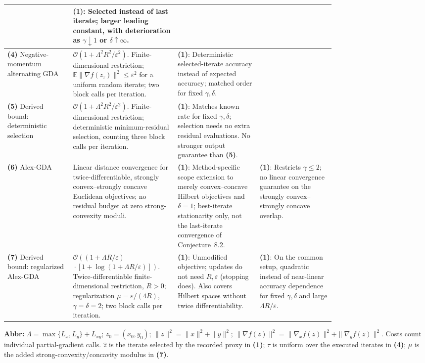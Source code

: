 \begin{table}[tp]
\begin{threeparttable}
\begin{tabularx}{\linewidth}{@{}>{\raggedright\arraybackslash}p{0.20\linewidth}>{\raggedright\arraybackslash}p{0.32\linewidth}>{\raggedright\arraybackslash}p{0.25\linewidth}>{\raggedright\arraybackslash}X@{}}
& \textbf{(1)}: Selected instead of last iterate; larger leading constant, with deterioration as $\gamma\downarrow1$ or $\delta\uparrow\infty$. \\
\midrule
\textbf{(4)} Negative-momentum alternating GDA \citep[Thm.~3.1]{bscShugart2026}
& $\mathcal{O}(1+\Lambda^2R^2/\varepsilon^2)$.
Finite-dimensional restriction; $\mathbb{E}\|\nabla f(z_\tau)\|^2\le\varepsilon^2$ for a uniform random iterate; two block calls per iteration.
& \textbf{(1)}: Deterministic selected-iterate accuracy instead of expected accuracy; matched order for fixed $\gamma,\delta$.
& \\
\midrule
\textbf{(5)} Derived bound: deterministic selection \citep[Thm.~3.1]{bscShugart2026}
& $\mathcal{O}(1+\Lambda^2R^2/\varepsilon^2)$.
Finite-dimensional restriction; deterministic minimum-residual selection, counting three block calls per iteration.
& \textbf{(1)}: Matches known rate for fixed $\gamma,\delta$; selection needs no extra residual evaluations. No stronger output guarantee than \textbf{(5)}.
& \\
\midrule
\textbf{(6)} Alex-GDA \citep[Thm.~5.1]{bscLee2024}
& Linear distance convergence for twice-differentiable, strongly convex--strongly concave Euclidean objectives; no residual budget at zero strong-convexity moduli.
& \textbf{(1)}: Method-specific scope extension to merely convex--concave Hilbert objectives and $\delta=1$; best-iterate stationarity only, not the last-iterate convergence of Conjecture~8.2.
& \textbf{(1)}: Restricts $\gamma\le2$; no linear convergence guarantee on the strongly convex--strongly concave overlap. \\
\midrule
\textbf{(7)} Derived bound: regularized Alex-GDA \citep[Thm.~5.1, App.~D]{bscLee2024}
& $\mathcal{O}\!\left((1+\Lambda R/\varepsilon)\right.$\newline
$\left.{}\cdot[1+\log(1+\Lambda R/\varepsilon)]\right)$.
Twice-differentiable finite-dimensional restriction, $R>0$; regularization $\mu=\varepsilon/(4R)$, $\gamma=\delta=2$; two block calls per iteration.
& \textbf{(1)}: Unmodified objective; updates do not need $R,\varepsilon$ (stopping does). Also covers Hilbert spaces without twice differentiability.
& \textbf{(1)}: On the common setup, quadratic instead of near-linear accuracy dependence for fixed $\gamma,\delta$ and large $\Lambda R/\varepsilon$. \\
\bottomrule
\end{tabularx}
\begin{tablenotes}[flushleft]\footnotesize
\item[] \textbf{Abbr:} $\Lambda=\max\{L_x,L_y\}+L_{xy}$; $z_0=(x_0,y_0)$; $\|z\|^2=\|x\|^2+\|y\|^2$; $\|\nabla f(z)\|^2=\|\nabla_x f(z)\|^2+\|\nabla_y f(z)\|^2$. Costs count individual partial-gradient calls. $\hat z$ is the iterate selected by the recorded proxy in \textbf{(1)}; $\tau$ is uniform over the executed iterates in \textbf{(4)}; $\mu$ is the added strong-convexity/concavity modulus in \textbf{(7)}.

\end{tablenotes}
\end{threeparttable}
\end{table}
